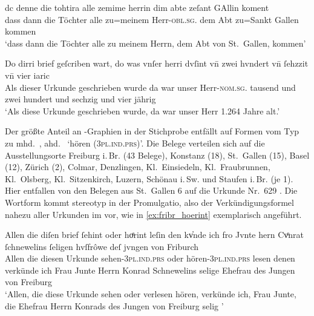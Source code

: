\begin{exe}
\ex \label{ex:herrin}
	\begin{xlist}
	\ex\label{ex:stg_herrin}
		\setlength{\glossglue}{5pt plus 2pt minus 1pt}
		\gll dc denne die tohtira alle zemime herrin dim abte zeſant GAllin
				koment\\
			dass dann die Töchter alle zu=meinem Herr-\textsc{obl.sg.\MascM}
				dem Abt zu=Sankt Gallen kommen \\
		\trans `dass dann die Töchter alle zu meinem Herrn, dem Abt von
			St.~Gallen, kommen'
			\parencites(Nr.~628, St.~Gallen, 1284)[56,34]{cao2}

	\ex\label{ex:col_herri}
		\gll Do dirri brief geſcriben wart, do was vnſer herri dvſint vn̄ zwei
				hvndert vn̄ ſehzzit vn̄ vier iaric \\
			Als dieser Urkunde geschrieben wurde da war unser
				Herr-\textsc{nom.sg.\MascM} tausend und zwei hundert und
				sechzig und vier jährig \\
		\trans `Als diese Urkunde geschrieben wurde, da war unser Herr
			1.264 Jahre alt.'
			\parencites(Nr.~N~53, Colmar, 1264)[37,15]{cao5}
\end{xlist}
\end{exe}

Der größte Anteil an -Graphien in der Stichprobe entfällt auf Formen vom
Typ  zu mhd.~, ahd.~ `hören
(\textsc{3pl.ind.prs})'. Die Belege verteilen sich auf die Ausstellungsorte
Freiburg i.\,Br. (43 Belege), Konstanz (18), St.~Gallen (15), Basel (12),
Zürich (2), Colmar, Denzlingen, Kl.~Einsiedeln, Kl.~Fraubrunnen, Kl.~Olsberg,
Kl.~Sitzenkirch, Luzern, Schönau i.\,Sw. und Staufen i.\,Br. (je 1). Hier
entfallen von den Belegen aus St.~Gallen 6 auf die Urkunde Nr.~629
\autocites(St.~Gallen, 1284)[57,9--57,35]{cao2}. Die Wortform 
kommt stereotyp in der Promulgatio, also der Verkündigungsformel nahezu aller
Urkunden im  vor, wie in \cref{ex:fribr_hoerint} exemplarisch
angeführt.

\begin{exe}
\ex\label{ex:fribr_hoerint}
	\gll Allen die diſen brief ſehint oder hoͤrint leſin den kv̓nde ich fro
			Jvnte hern Cvͦnrat ſchnewelins ſeligen hvſfrôwe deſ jvngen von
			Friburch \\
		Allen die diesen Urkunde sehen-\textsc{3pl.ind.prs} oder
			hören-\textsc{3pl.ind.prs} lesen denen verkünde ich Frau Junte Herrn
			Konrad Schnewelins selige Ehefrau des Jungen von Freiburg \\
	\trans `Allen, die diese Urkunde sehen oder verlesen hören, verkünde
		ich, Frau Junte, die Ehefrau Herrn Konrads des Jungen von Freiburg
		selig \textelp{}'
		\parencites(Nr.~328, Freiburg i.\,Br., 1277)[314,33--34]{cao1}
\end{exe}

